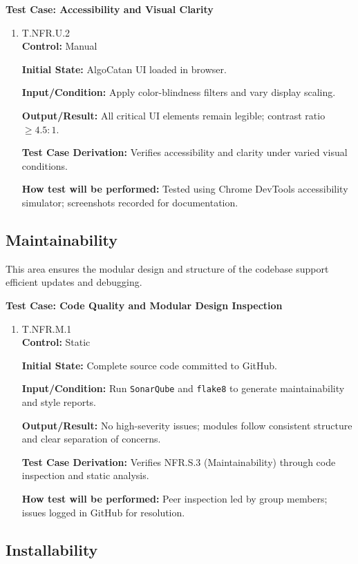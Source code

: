 \documentclass[12pt, titlepage]{article}
\begin{document}
\textbf{Test Case: Accessibility and Visual Clarity}

\begin{enumerate}
\item{\hypertarget{T.NFR.U.2}{T.NFR.U.2}\\}
\textbf{Control:} Manual

\textbf{Initial State:} AlgoCatan UI loaded in browser.

\textbf{Input/Condition:} Apply color-blindness filters and vary display scaling.

\textbf{Output/Result:} All critical UI elements remain legible; contrast ratio $\geq 4.5:1$.

\textbf{Test Case Derivation:} Verifies accessibility and clarity under varied visual conditions.

\textbf{How test will be performed:} Tested using Chrome DevTools accessibility simulator; screenshots recorded for documentation.
\end{enumerate}

\subsection{Maintainability}

This area ensures the modular design and structure of the codebase support efficient updates and debugging.

\textbf{Test Case: Code Quality and Modular Design Inspection}

\begin{enumerate}
\item{\hypertarget{T.NFR.M.1}{T.NFR.M.1}\\}
\textbf{Control:} Static

\textbf{Initial State:} Complete source code committed to GitHub.

\textbf{Input/Condition:} Run \texttt{SonarQube} and \texttt{flake8} to generate maintainability and style reports.

\textbf{Output/Result:} No high-severity issues; modules follow consistent structure and clear separation of concerns.

\textbf{Test Case Derivation:} Verifies NFR.S.3 (Maintainability) through code inspection and static analysis.

\textbf{How test will be performed:} Peer inspection led by group members; issues logged in GitHub for resolution.
\end{enumerate}

\subsection{Installability}
\end{document}
